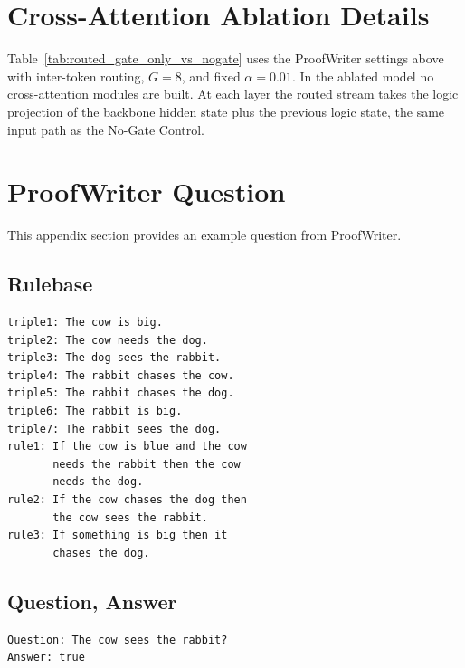 \documentclass[10pt,twocolumn,letterpaper]{article}
\begin{document}
\section{Cross-Attention Ablation Details}
Table~\ref{tab:routed_gate_only_vs_nogate} uses the ProofWriter settings above
with inter-token routing, $G=8$, and fixed $\alpha=0.01$. In the ablated model
no cross-attention modules are built. At each layer the routed stream takes the
logic projection of the backbone hidden state plus the previous logic state,
the same input path as the No-Gate Control.

\section{ProofWriter Question}
This appendix section provides an example question from ProofWriter.

\subsection{Rulebase}
\begin{verbatim}
triple1: The cow is big.
triple2: The cow needs the dog.
triple3: The dog sees the rabbit.
triple4: The rabbit chases the cow.
triple5: The rabbit chases the dog.
triple6: The rabbit is big.
triple7: The rabbit sees the dog.
rule1: If the cow is blue and the cow
       needs the rabbit then the cow
       needs the dog.
rule2: If the cow chases the dog then
       the cow sees the rabbit.
rule3: If something is big then it
       chases the dog.
\end{verbatim}

\subsection{Question, Answer}
\begin{verbatim}
Question: The cow sees the rabbit?
Answer: true
\end{verbatim}
\end{document}
